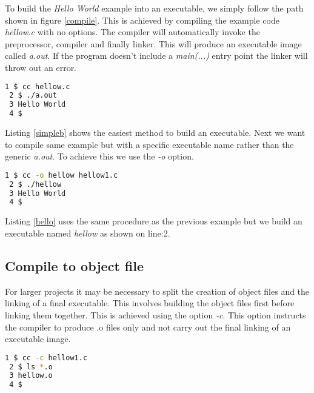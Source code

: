 To build the \textit{Hello World} example into an executable, we simply follow the path shown in figure \ref{compile}. This is achieved by compiling the example code \textit{hellow.c} with no options. The compiler will automatically invoke the preprocessor, compiler and finally linker. This will produce an executable image called \textit{a.out}. If the program doesn't include a \textit{main(...)} entry point the linker will throw out an error.\\

\begin{lstlisting}[language=bash,showstringspaces=false,caption={Example compile and execute},captionpos=b,label=simpleb]
 1 $ cc hellow.c
 2 $ ./a.out
 3 Hello World
 4 $ 	
\end{lstlisting}

Listing \ref{simpleb} shows the easiest method to build an executable. Next we want to compile same example but with a specific executable name rather than the generic \textit{a.out}. To achieve this we use the \textit{-o} option.\\ 

\begin{lstlisting}[language=bash,showstringspaces=false,caption={Example compiling and specifying the execution name},captionpos=b,label=hello]
 1 $ cc -o hellow hellow1.c
 2 $ ./hellow
 3 Hello World
 4 $ 	
\end{lstlisting}

Listing \ref{hello} uses the same procedure as the previous example but we build an executable named \textit{hellow} as shown on line:2.

\subsection{Compile to object file}

For larger projects it may be necessary to split the creation of object files and the linking of a final executable. This involves building the object files first before linking them together. This is achieved using the option \textit{-c}. This option instructs the compiler to produce .o files only and not carry out the final linking of an executable image.\\

\begin{lstlisting}[language=bash,showstringspaces=false,caption={Example compiling only, producing object files},captionpos=b,label=linkonly]
 1 $ cc -c hellow1.c
 2 $ ls *.o
 3 hellow.o
 4 $ 	
\end{lstlisting}

